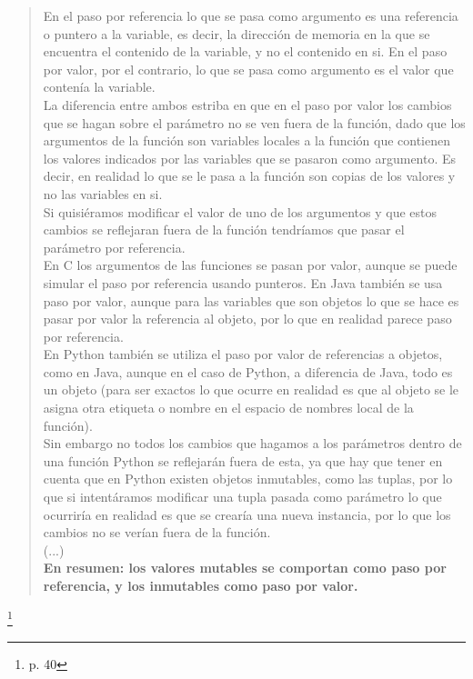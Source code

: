 \begin{quotation}
En el paso por referencia lo que se pasa como argumento es una referencia o puntero a la variable, es decir, la dirección de memoria en la que se encuentra el contenido de la variable, y no el contenido en si. En el paso por valor, por el contrario, lo que se pasa como argumento es el valor que contenía la variable.\\

La diferencia entre ambos estriba en que en el paso por valor los cambios que se hagan sobre el parámetro no se ven fuera de la función, dado que los argumentos de la función son variables locales a la función que contienen los valores indicados por las variables que se
pasaron como argumento. Es decir, en realidad lo que se le pasa a la función son copias de los valores y no las variables en si.\\

Si quisiéramos modificar el valor de uno de los argumentos y que estos cambios se reflejaran fuera de la función tendríamos que pasar el parámetro por referencia.\\

En C los argumentos de las funciones se pasan por valor, aunque se puede simular el paso por referencia usando punteros. En Java también se usa paso por valor, aunque para las variables que son objetos lo que se hace es pasar por valor la referencia al objeto, por lo que en realidad parece paso por referencia.\\

En Python también se utiliza el paso por valor de referencias a objetos, como en Java, aunque en el caso de Python, a diferencia de Java, todo es un objeto (para ser exactos lo que ocurre en realidad es que al objeto se le asigna otra etiqueta o nombre en el espacio de nombres local de la función).\\

Sin embargo no todos los cambios que hagamos a los parámetros dentro de una función Python se reflejarán fuera de esta, ya que hay que tener en cuenta que en Python existen objetos inmutables, como las tuplas, por lo que si intentáramos modificar una tupla pasada como parámetro lo que ocurriría en realidad es que se crearía una nueva instancia, por lo que los cambios no se verían fuera de la función.\\

(...)\\

\textbf{En resumen: los valores mutables se comportan como paso por referencia, y los inmutables como paso por valor.}
\end{quotation} \footnote{\cite{Duque} p. 40}\\

